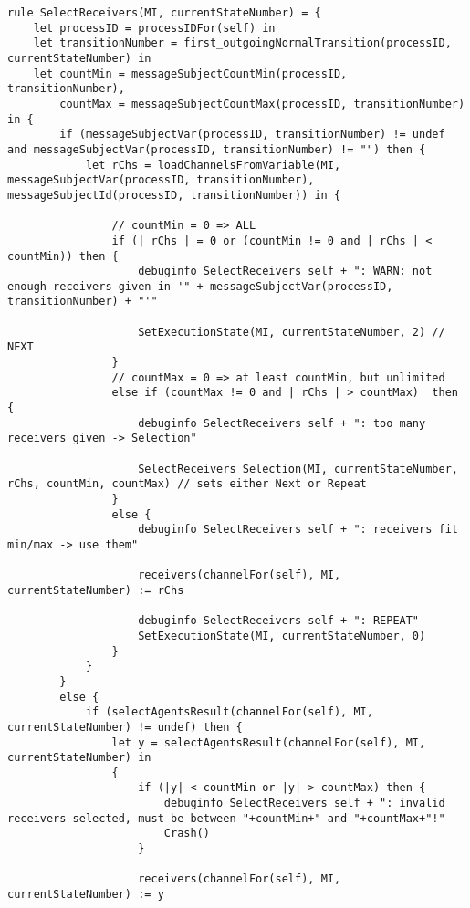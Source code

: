 \begin{listing}[H]
\begin{verbatim}
rule SelectReceivers(MI, currentStateNumber) = {
    let processID = processIDFor(self) in
    let transitionNumber = first_outgoingNormalTransition(processID, currentStateNumber) in
    let countMin = messageSubjectCountMin(processID, transitionNumber),
        countMax = messageSubjectCountMax(processID, transitionNumber) in {
        if (messageSubjectVar(processID, transitionNumber) != undef and messageSubjectVar(processID, transitionNumber) != "") then {
            let rChs = loadChannelsFromVariable(MI, messageSubjectVar(processID, transitionNumber), messageSubjectId(processID, transitionNumber)) in {

                // countMin = 0 => ALL
                if (| rChs | = 0 or (countMin != 0 and | rChs | < countMin)) then {
                    debuginfo SelectReceivers self + ": WARN: not enough receivers given in '" + messageSubjectVar(processID, transitionNumber) + "'"

                    SetExecutionState(MI, currentStateNumber, 2) // NEXT
                }
                // countMax = 0 => at least countMin, but unlimited
                else if (countMax != 0 and | rChs | > countMax)  then {
                    debuginfo SelectReceivers self + ": too many receivers given -> Selection"

                    SelectReceivers_Selection(MI, currentStateNumber, rChs, countMin, countMax) // sets either Next or Repeat
                }
                else {
                    debuginfo SelectReceivers self + ": receivers fit min/max -> use them"

                    receivers(channelFor(self), MI, currentStateNumber) := rChs

                    debuginfo SelectReceivers self + ": REPEAT"
                    SetExecutionState(MI, currentStateNumber, 0)
                }
            }
        }
        else {
            if (selectAgentsResult(channelFor(self), MI, currentStateNumber) != undef) then {
                let y = selectAgentsResult(channelFor(self), MI, currentStateNumber) in
                {
                    if (|y| < countMin or |y| > countMax) then {
                        debuginfo SelectReceivers self + ": invalid receivers selected, must be between "+countMin+" and "+countMax+"!"
                        Crash()
                    }

                    receivers(channelFor(self), MI, currentStateNumber) := y


\end{verbatim}
\end{listing}
